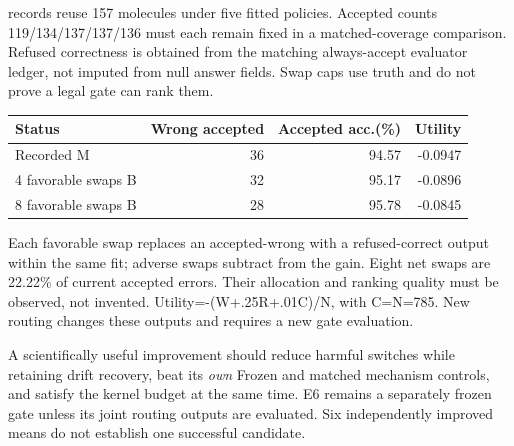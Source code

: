 \documentclass[10pt,letterpaper]{article}
\newcommand{\B}[1]{{\color{GuideBlue}#1}}
\newcommand{\note}[1]{{\fontsize{8.5}{10.5}\selectfont #1\par}}
\newcommand{\sect}[1]{\vspace{5pt}{\large\bfseries #1}\par\vspace{2pt}}
\newenvironment{clean}{\begin{center}\fontsize{9.5}{11.5}\selectfont\setlength{\tabcolsep}{6pt}\renewcommand{\arraystretch}{1.06}}{\end{center}}
\begin{document}
\note{785 records reuse 157 molecules under five fitted policies. Accepted counts 119/134/137/137/136 must each remain fixed in a matched-coverage comparison. Refused correctness is obtained from the matching always-accept evaluator ledger, not imputed from null answer fields. Swap caps use truth and do not prove a legal gate can rank them.}
\par\noindent\begin{minipage}{\linewidth}\end{minipage}\par
\begin{clean}\begin{tabular}{@{}lrrr@{}}
\toprule
Status & Wrong accepted & Accepted acc.(\%) & Utility \\
\midrule
Recorded M & 36 & 94.57 & -0.0947 \\
\B{4 favorable swaps B} & \B{32} & \B{95.17} & \B{-0.0896} \\
\B{8 favorable swaps B} & \B{28} & \B{95.78} & \B{-0.0845} \\
\bottomrule\end{tabular}\end{clean}
\note{Each favorable swap replaces an accepted-wrong with a refused-correct output within the same fit; adverse swaps subtract from the gain. Eight net swaps are 22.22\% of current accepted errors. Their allocation and ranking quality must be observed, not invented. Utility=-(W+.25R+.01C)/N, with C=N=785. New routing changes these outputs and requires a new gate evaluation.}
\sect{A joint success criterion}
A scientifically useful improvement should reduce harmful switches while retaining drift recovery,
beat its \emph{own} Frozen and matched mechanism controls, and satisfy the kernel budget at the same time.
E6 remains a separately frozen gate unless its joint routing outputs are evaluated. Six independently improved means do not establish one successful candidate.
\newpage
\sect{Distribution checks for the scientist}
\end{document}
